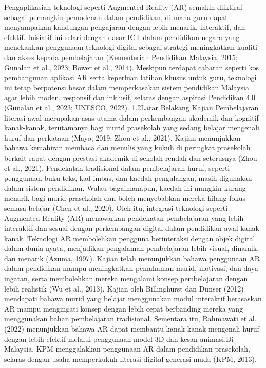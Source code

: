 Pengaplikasian teknologi seperti Augmented Reality (AR) semakin diiktiraf sebagai pemangkin pemodenan dalam pendidikan, di mana guru dapat menyampaikan kandungan pengajaran dengan lebih menarik, interaktif, dan efektif. Inisiatif ini selari dengan dasar ICT dalam pendidikan negara yang menekankan penggunaan teknologi digital sebagai strategi meningkatkan kualiti dan akses kepada pembelajaran (Kementerian Pendidikan Malaysia, 2015; Gunalan et al., 2023; Bower et al., 2014). Meskipun terdapat cabaran seperti kos pembangunan aplikasi AR serta keperluan latihan khusus untuk guru, teknologi ini tetap berpotensi besar dalam memperkasakan sistem pendidikan Malaysia agar lebih moden, responsif dan inklusif, selaras dengan aspirasi Pendidikan 4.0 (Gunalan et al., 2023; UNESCO, 2022).
1.2Latar Belakang Kajian
Pembelajaran literasi awal merupakan asas utama dalam perkembangan akademik dan kognitif kanak-kanak, terutamanya bagi murid prasekolah yang sedang belajar mengenali huruf dan perkataan (Mayo, 2019; Zhou et al., 2021). Kajian menunjukkan bahawa kemahiran membaca dan menulis yang kukuh di peringkat prasekolah berkait rapat dengan prestasi akademik di sekolah rendah dan seterusnya (Zhou et al., 2021).
Pendekatan tradisional dalam pembelajaran huruf, seperti penggunaan buku teks, kad imbas, dan kaedah pengulangan, masih digunakan dalam sistem pendidikan. Walau bagaimanapun, kaedah ini mungkin kurang menarik bagi murid prasekolah dan boleh menyebabkan mereka hilang fokus semasa belajar (Chen et al., 2020). Oleh itu, integrasi teknologi seperti Augmented Reality (AR) menawarkan pendekatan pembelajaran yang lebih interaktif dan sesuai dengan perkembangan digital dalam pendidikan awal kanak-kanak.
Teknologi AR membolehkan pengguna berinteraksi dengan objek digital dalam dunia nyata, menjadikan pengalaman pembelajaran lebih visual, dinamik, dan menarik (Azuma, 1997). Kajian telah menunjukkan bahawa penggunaan AR dalam pendidikan mampu meningkatkan pemahaman murid, motivasi, dan daya ingatan, serta membolehkan mereka mengalami konsep pembelajaran dengan lebih realistik (Wu et al., 2013).
Kajian oleh Billinghurst dan Dünser (2012) mendapati bahawa murid yang belajar menggunakan modul interaktif berasaskan AR mampu mengingati konsep dengan lebih cepat berbanding mereka yang menggunakan bahan pembelajaran tradisional. Sementara itu, Rahmawati et al. (2022) menunjukkan bahawa AR dapat membantu kanak-kanak mengenali huruf dengan lebih efektif melalui penggunaan model 3D dan kesan animasi.Di Malaysia, KPM menggalakkan penggunaan AR dalam pendidikan prasekolah, selaras dengan usaha memperkukuh literasi digital generasi muda (KPM, 2013).
